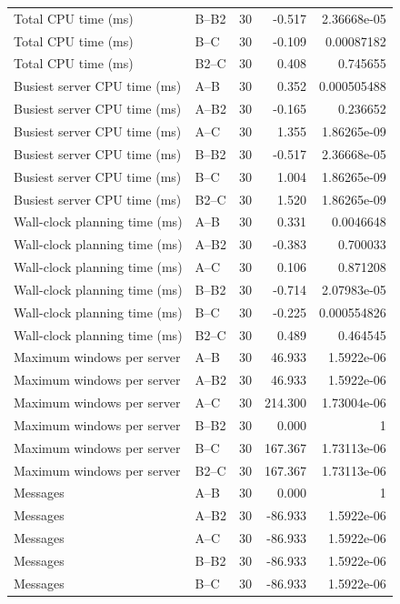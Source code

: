 \begin{table}[t]
\begin{tabular}{llrrr}
Total CPU time (ms) & B--B2 & 30 & -0.517 & 2.36668e-05 \\
Total CPU time (ms) & B--C & 30 & -0.109 & 0.00087182 \\
Total CPU time (ms) & B2--C & 30 & 0.408 & 0.745655 \\
Busiest server CPU time (ms) & A--B & 30 & 0.352 & 0.000505488 \\
Busiest server CPU time (ms) & A--B2 & 30 & -0.165 & 0.236652 \\
Busiest server CPU time (ms) & A--C & 30 & 1.355 & 1.86265e-09 \\
Busiest server CPU time (ms) & B--B2 & 30 & -0.517 & 2.36668e-05 \\
Busiest server CPU time (ms) & B--C & 30 & 1.004 & 1.86265e-09 \\
Busiest server CPU time (ms) & B2--C & 30 & 1.520 & 1.86265e-09 \\
Wall-clock planning time (ms) & A--B & 30 & 0.331 & 0.0046648 \\
Wall-clock planning time (ms) & A--B2 & 30 & -0.383 & 0.700033 \\
Wall-clock planning time (ms) & A--C & 30 & 0.106 & 0.871208 \\
Wall-clock planning time (ms) & B--B2 & 30 & -0.714 & 2.07983e-05 \\
Wall-clock planning time (ms) & B--C & 30 & -0.225 & 0.000554826 \\
Wall-clock planning time (ms) & B2--C & 30 & 0.489 & 0.464545 \\
Maximum windows per server & A--B & 30 & 46.933 & 1.5922e-06 \\
Maximum windows per server & A--B2 & 30 & 46.933 & 1.5922e-06 \\
Maximum windows per server & A--C & 30 & 214.300 & 1.73004e-06 \\
Maximum windows per server & B--B2 & 30 & 0.000 & 1 \\
Maximum windows per server & B--C & 30 & 167.367 & 1.73113e-06 \\
Maximum windows per server & B2--C & 30 & 167.367 & 1.73113e-06 \\
Messages & A--B & 30 & 0.000 & 1 \\
Messages & A--B2 & 30 & -86.933 & 1.5922e-06 \\
Messages & A--C & 30 & -86.933 & 1.5922e-06 \\
Messages & B--B2 & 30 & -86.933 & 1.5922e-06 \\
Messages & B--C & 30 & -86.933 & 1.5922e-06 \\

\end{tabular}
\end{table}
